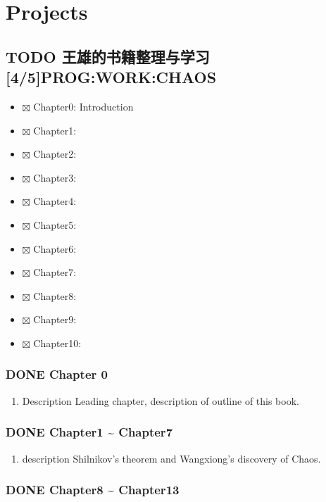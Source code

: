 \documentclass[11pt]{article}
\author{CuriousBull}
\date{\today}
\title{}
\begin{document}
\tableofcontents

\section{Projects}
\label{sec:orgheadline18}

\subsection{{\bfseries\sffamily TODO} 王雄的书籍整理与学习 [4/5]\hfill{}\textsc{PROG:WORK:CHAOS}}
\label{sec:orgheadline9}
\begin{itemize}
\item $\boxtimes$ Chapter0: Introduction
\item $\boxtimes$ Chapter1:
\item $\boxtimes$ Chapter2:
\item $\boxtimes$ Chapter3:
\item $\boxtimes$ Chapter4:
\item $\boxtimes$ Chapter5:
\item $\boxtimes$ Chapter6:
\item $\boxtimes$ Chapter7:
\item $\boxtimes$ Chapter8:
\item $\boxtimes$ Chapter9:
\item $\boxtimes$ Chapter10:
\end{itemize}

\subsubsection{{\bfseries\sffamily DONE} Chapter 0}
\label{sec:orgheadline2}
\begin{enumerate}
\item Description
\label{sec:orgheadline1}
Leading chapter, description of outline of this book.
\end{enumerate}


\subsubsection{{\bfseries\sffamily DONE} Chapter1 \textasciitilde{}  Chapter7}
\label{sec:orgheadline4}
\begin{enumerate}
\item description
\label{sec:orgheadline3}
Shilnikov's theorem and Wangxiong's discovery of Chaos.
\end{enumerate}


\subsubsection{{\bfseries\sffamily DONE} Chapter8 \textasciitilde{} Chapter13}
\label{sec:orgheadline5}
\end{document}
